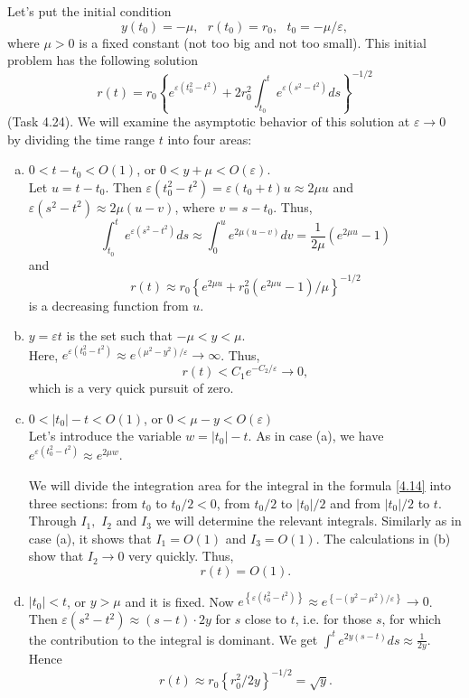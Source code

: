 Let's put the initial condition
$$
y(t_{0})=-\mu ,\text{ \ \ \ }r(t_{0})=r_{0},\text{ \ \ }t_{0}=-\mu
/\varepsilon ,
$$
where $\mu >0$ is a fixed constant (not too big and not too small). This initial problem has the following solution
\begin{equation}
\label{4.14}
r(t)=r_{0}\left\{ e^{\varepsilon \left( t_{0}^{2}-t^{2}\right)
}+2r_{0}^{2}\int_{t_{0}}^{t}e^{\varepsilon \left( s^{2}-t^{2}\right)
}ds\right\} ^{-1/2}
\end{equation}
(Task 4.24). We will examine the asymptotic behavior of this solution at $\varepsilon \to 0$ by dividing the time range $t$ into four areas:
\begin{enumerate}[(a)]
	\item $0<t-t_{0}<O(1)$, or $0<y+\mu <O(\varepsilon ).$\\
	Let $u=t-t_{0}$. Then $\varepsilon \left( t_{0}^{2}-t^{2}\right)
	=\varepsilon (t_{0}+t)u\approx 2\mu u$ and $\varepsilon \left(
	s^{2}-t^{2}\right) \approx 2\mu (u-v)$, where $v=s-t_{0}$. Thus,
	$$
	\int_{t_{0}}^{t}e^{\varepsilon \left( s^{2}-t^{2}\right) }ds\approx
	\int_{0}^{u}e^{2\mu (u-v)}dv=\frac{1}{2\mu }(e^{2\mu u}-1)
	$$
	and
	$$
	r(t)\approx r_{0}\left\{ e^{2\mu u}+r_{0}^{2}(e^{2\mu u}-1)/\mu \right\}
	^{-1/2}
	$$
	is a decreasing function from $u$.
	\item $y=\varepsilon t$ is the set such that $-\mu <y<\mu$.\\
	Here, $e^{\varepsilon \left( t_{0}^{2}-t^{2}\right) }\approx e^{\left( \mu
		^{2}-y^{2}\right) /\varepsilon }\rightarrow \infty$. Thus,
	$$
	r(t)<C_{1}e^{-C_{2}/\varepsilon }\rightarrow 0,
	$$%
	which is a very quick pursuit of zero.
	\item $0<\left\vert t_{0}\right\vert -t<O(1)$, or $0<\mu -y<O(\varepsilon )$\\
	Let's introduce the variable $w=\left\vert t_{0}\right\vert -t$. As in case (a), we have $e^{\varepsilon \left( t_{0}^{2}-t^{2}\right) }\approx
	e^{2\mu w}.$
	
	We will divide the integration area for the integral in the formula \eqref{4.14} into three sections: from $t_{0}$ to $t_{0}/2<0$, from $t_{0}/2$ to $\left\vert t_{0}\right\vert /2$ and from $\left\vert t_{0}\right\vert /2$ to $t$. Through $I_{1},$ $I_{2}$ and $I_{3}$ we will determine the relevant integrals. Similarly as in case (a), it shows that $I_{1}=O(1)$ and $I_{3}=O(1)$. The calculations in (b) show that $I_{2}\to 0$ very quickly. Thus,
	$$
	r(t)=O(1).
	$$
	\item $\left\vert t_{0}\right\vert <t$, or $y>\mu $ and it is fixed. Now
	$e^{\left\{ \varepsilon \left( t_{0}^{2}-t^{2}\right) \right\}} \approx e^{\left\{ -(y^{2}-\mu ^{2})/\varepsilon \right\}} \to 0$. Then $\varepsilon \left( s^{2}-t^{2}\right) \approx (s-t)\cdot 2y$ for $s$ close to $t$, i.e. for those $s$, for which the contribution to the integral is dominant. We get $\int^{t}e^{2y(s-t)}ds \approx \frac{1}{2y}$. Hence
	$$
	r(t)\approx r_{0}\left\{ r_{0}^{2}/2y\right\} ^{-1/2}=\sqrt{y}.
	$$
\end{enumerate}

